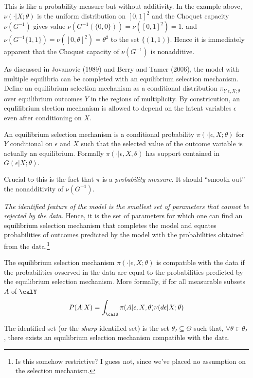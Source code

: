 This is like a probability measure but without additivity. In the example above, $\nu(\cdot| X;\theta)$ is the uniform distribution on $[0,1]^2$ and the Choquet capacity $\nu(G^{-1})$ gives value $\nu(G^{-1}(\{0,0\})) = \nu([0,1]^2) = 1$. and $\nu(G^{-1}\{1,1\}) = \nu([0,\theta]^2)= \theta^2$ to the set $\{(1,1)\}$. Hence it is immediately apparent that the Choquet capacity of $\nu(G^{-1})$ is nonadditive.

As discussed in Jovanovic (1989) and Berry and Tamer (2006), the model with multiple equilibria can be completed with an equilibrium selection mechanism. Define an equilibrium selection mechanism as a conditional distribution $\pi_{Y|\epsilon, X;\theta}$ over equilibrium outcomes $Y$ in the regions of multiplicity. By constricution, an equlilibrium slection mechanism is allowed to depend on the latent variables $\epsilon$ even after conditioning on $X$. 

\begin{definition}
	\label{def:GH-2}
	An equilibrium selection mechanism is a conditional probability $\pi(\cdot|\epsilon, X;\theta)$ for $Y$ conditional on $\epsilon$ and $X$ such that the selected value of the outcome variable is actually an equilibrium. Formally $\pi(\cdot|\epsilon, X,\theta)$ has support contained in $G(\epsilon|X;\theta)$.
\end{definition}

Crucial to this is the fact that $\pi$ is a \textit{probability measure}. It should ``smooth out'' the nonadditivity of $\nu(G^{-1})$. 

\emph{The identified feature of the model is the smallest set of parameters that cannot be rejected by the data}. Hence, it is the set of parameters for which one can find an equilibrium selection mechanism that completes the model and equates probabilities of outcomes predicted by the model with the probabilities obtained from the data.\footnote{Is this somehow restrictive? I guess not, since we've placed no assumption on the selection mechanism.}

\begin{definition}
	\label{def:GH-3}
	The equilibrium selection mechanism $\pi(\cdot|\epsilon, X;\theta)$ is compatible with the data if the probabilities ovserved in the data are equal to the probabilities predicted by the equilibrium selection mechanism. More formally, if for all measurable subsets $A$ of $\calY$
	\[P(A|X) = \int_\calU \pi(A|\epsilon, X,\theta) \nu(d\epsilon |X;\theta)\]
\end{definition}
\begin{definition}
	\label{def:GH-4}
	The identified set (or the \emph{sharp} identified set) is the set $\theta_I \subseteq\Theta$ such that, $\forall \theta \in \theta_I$, there exists an equilibrium selection mechanism compatible with the data.
\end{definition}


